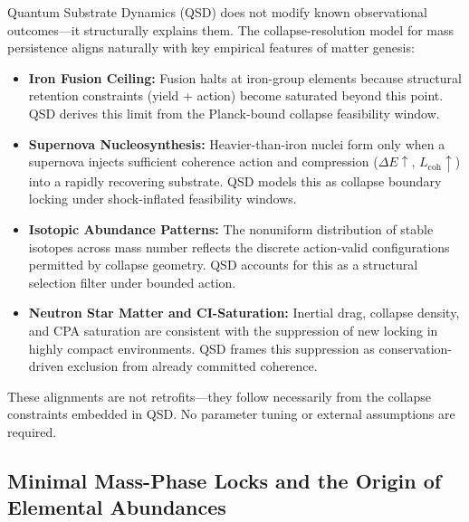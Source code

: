 \documentclass[preprints,article,submit,pdftex,moreauthors]{Definitions/mdpi}
\begin{document}
\begin{tcolorbox}[colback=gray!5!white, colframe=black!50!black, title={Empirical Anchors for Collapse-Driven Mass Nucleation}]
Quantum Substrate Dynamics (QSD) does not modify known observational outcomes—it structurally explains them. The collapse-resolution model for mass persistence aligns naturally with key empirical features of matter genesis:

\begin{itemize}
    \item \textbf{Iron Fusion Ceiling:} Fusion halts at iron-group elements because structural retention constraints (yield + action) become saturated beyond this point. QSD derives this limit from the Planck-bound collapse feasibility window.
    
    \item \textbf{Supernova Nucleosynthesis:} Heavier-than-iron nuclei form only when a supernova injects sufficient coherence action and compression (\( \Delta E \uparrow \), \( L_{\mathrm{coh}} \uparrow \)) into a rapidly recovering substrate. QSD models this as collapse boundary locking under shock-inflated feasibility windows.

    \item \textbf{Isotopic Abundance Patterns:} The nonuniform distribution of stable isotopes across mass number reflects the discrete action-valid configurations permitted by collapse geometry. QSD accounts for this as a structural selection filter under bounded action.

    \item \textbf{Neutron Star Matter and CI-Saturation:} Inertial drag, collapse density, and CPA saturation are consistent with the suppression of new locking in highly compact environments. QSD frames this suppression as conservation-driven exclusion from already committed coherence.

\end{itemize}

\vspace{4pt}
These alignments are not retrofits—they follow necessarily from the collapse constraints embedded in QSD. No parameter tuning or external assumptions are required.
\end{tcolorbox}

\subsection{Minimal Mass-Phase Locks and the Origin of Elemental Abundances}
\end{document}
